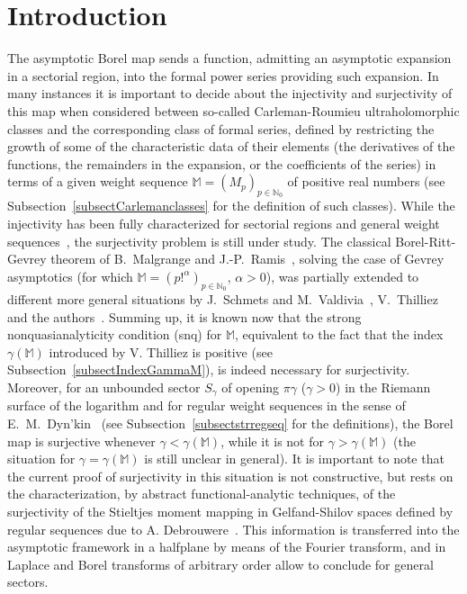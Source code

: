 \documentclass[11pt,a4paper]{article}
\theoremstyle{plain}
\theoremstyle{definition}
\newcommand{\N}{\mathbb{N}}
\newcommand{\M}{\mathbb{M}}
\begin{document}
\section{Introduction}
The asymptotic Borel map sends a function, admitting an asymptotic expansion in a sectorial region, into the formal power series providing such expansion. In many instances it is important to decide about the injectivity and surjectivity of this map when considered between so-called Carleman-Roumieu ultraholomorphic classes and the corresponding class of formal series, defined by restricting the growth of some of the characteristic data of their elements (the derivatives of the functions, the remainders in the expansion, or the coefficients of the series) in terms of a given weight sequence $\M=(M_p)_{p\in\N_0}$ of positive real numbers (see Subsection~\ref{subsectCarlemanclasses} for the definition of such classes). While the injectivity has been fully characterized for sectorial regions and general weight sequences~\cite{Mandelbrojt,Salinas,JimenezSanzSchindlInjectSurject}, the surjectivity problem is still under study.
The classical Borel-Ritt-Gevrey theorem of B.~Malgrange and J.-P.~Ramis~\cite{Ramis1}, solving the case of Gevrey asymptotics (for which $\M=(p!^{\alpha})_{p\in\N_0}$, $\alpha>0$), was partially extended to different more general situations by J.~Schmets and M.~Valdivia~\cite{SchmetsValdivia00}, V.~Thilliez~\cite{Thilliez95,Thilliez03} and the authors~\cite{SanzFlatProxOrder,JimenezSanzSchindlInjectSurject,JimenezSanzSchindlSurjectDC}. Summing up, it is known now that the strong nonquasianalyticity condition (snq) for $\M$, equivalent to the fact that the index $\gamma(\M)$ introduced by V. Thilliez is positive (see Subsection~\ref{subsectIndexGammaM}), is indeed necessary for surjectivity. Moreover, for an unbounded sector $S_{\gamma}$ of opening $\pi\gamma$ ($\gamma>0$) in the Riemann surface of the logarithm and for regular weight sequences in the sense of E.~M.~Dyn'kin~\cite{Dynkin80} (see Subsection~\ref{subsectstrregseq} for the definitions),
the Borel map is surjective whenever $\gamma<\gamma(\M)$, while it is not for $\gamma>\gamma(\M)$ (the situation for $\gamma=\gamma(\M)$ is still unclear in general). It is important to note that
the current proof of surjectivity in this situation is not constructive, but rests on the characterization, by abstract functional-analytic techniques, of the surjectivity of the Stieltjes moment mapping in Gelfand-Shilov spaces defined by regular sequences due to A. Debrouwere~\cite{momentsdebrouwere}. This information is transferred into the asymptotic framework in a halfplane by means of the Fourier transform, and in~\cite{JimenezSanzSchindlSurjectDC} Laplace and Borel transforms of arbitrary order allow to conclude for general sectors.
\end{document}
